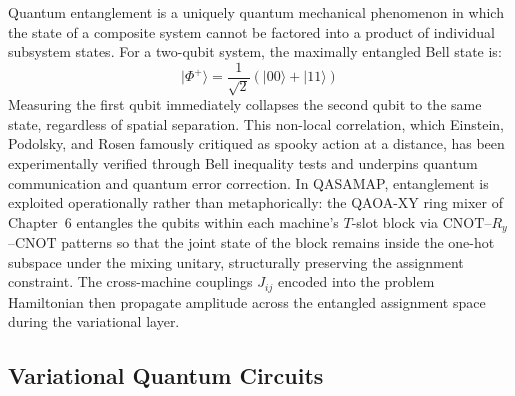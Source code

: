 Quantum entanglement is a uniquely quantum mechanical phenomenon in which the state of a composite system cannot be factored into a product of individual subsystem states. For a two-qubit system, the maximally entangled Bell state is:
\begin{equation}
    |\Phi^+\rangle = \frac{1}{\sqrt{2}}\left(|00\rangle + |11\rangle\right)
    \label{eq:bell_state}
\end{equation}
Measuring the first qubit immediately collapses the second qubit to the same state, regardless of spatial separation. This non-local correlation, which Einstein, Podolsky, and Rosen famously critiqued as spooky action at a distance, has been experimentally verified through Bell inequality tests and underpins quantum communication and quantum error correction.
In QASAMAP, entanglement is exploited operationally rather than metaphorically: the QAOA-XY ring mixer of Chapter~6 entangles the qubits within each machine's $T$-slot block via $\mathrm{CNOT}$--$R_y$--$\mathrm{CNOT}$ patterns so that the joint state of the block remains inside the one-hot subspace under the mixing unitary, structurally preserving the assignment constraint. The cross-machine couplings $J_{ij}$ encoded into the problem Hamiltonian then propagate amplitude across the entangled assignment space during the variational layer.

\subsection{Variational Quantum Circuits}

